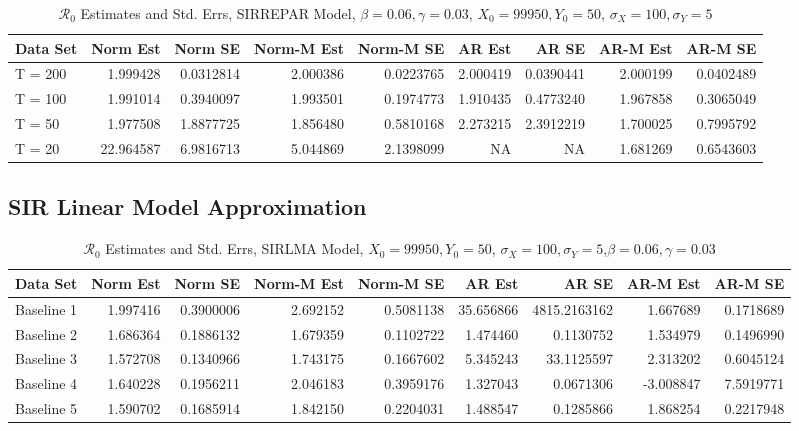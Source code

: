 \documentclass[12pt]{article}
\newcommand{\rr}{\ensuremath{\mathcal{R}_0}}
\begin{document}
\begin{table}[H]
	
	\caption{\label{tab:}$\rr$ Estimates and Std. Errs, SIRREPAR Model,
		$\beta = 0.06, \gamma = 0.03$, $X_0 = 99950, Y_0 = 50$, $\sigma_X = 100, \sigma_Y = 5$}
	\centering
	\begin{tabular}[t]{l|r|r|r|r|r|r|r|r}
		\hline
		Data Set & Norm Est & Norm SE & Norm-M Est & Norm-M SE & AR Est & AR SE & AR-M Est & AR-M SE\\
		\hline
		T = 200 & 1.999428 & 0.0312814 & 2.000386 & 0.0223765 & 2.000419 & 0.0390441 & 2.000199 & 0.0402489\\
		\hline
		T = 100 & 1.991014 & 0.3940097 & 1.993501 & 0.1974773 & 1.910435 & 0.4773240 & 1.967858 & 0.3065049\\
		\hline
		T = 50 & 1.977508 & 1.8877725 & 1.856480 & 0.5810168 & 2.273215 & 2.3912219 & 1.700025 & 0.7995792\\
		\hline
		T = 20 & 22.964587 & 6.9816713 & 5.044869 & 2.1398099 & NA & NA & 1.681269 & 0.6543603\\
		\hline
	\end{tabular}
\end{table}

\subsection{SIR Linear Model Approximation}

\begin{table}[H]
	
	\caption{\label{tab:}$\rr$ Estimates and Std. Errs, SIRLMA Model,
		$X_0 = 99950, Y_0 = 50$, $\sigma_X = 100, \sigma_Y = 5$,$\beta = 0.06, \gamma = 0.03$}
	\centering
	\begin{footnotesize}
		\begin{tabular}[t]{l|r|r|r|r|r|r|r|r}
			\hline
			Data Set & Norm Est & Norm SE & Norm-M Est & Norm-M SE & AR Est & AR SE & AR-M Est & AR-M SE\\
			\hline
			Baseline 1 & 1.997416 & 0.3900006 & 2.692152 & 0.5081138 & 35.656866 & 4815.2163162 & 1.667689 & 0.1718689\\
			\hline
			Baseline 2 & 1.686364 & 0.1886132 & 1.679359 & 0.1102722 & 1.474460 & 0.1130752 & 1.534979 & 0.1496990\\
			\hline
			Baseline 3 & 1.572708 & 0.1340966 & 1.743175 & 0.1667602 & 5.345243 & 33.1125597 & 2.313202 & 0.6045124\\
			\hline
			Baseline 4 & 1.640228 & 0.1956211 & 2.046183 & 0.3959176 & 1.327043 & 0.0671306 & -3.008847 & 7.5919771\\
			\hline
			Baseline 5 & 1.590702 & 0.1685914 & 1.842150 & 0.2204031 & 1.488547 & 0.1285866 & 1.868254 & 0.2217948\\
			\hline
		\end{tabular}
	\end{footnotesize}
\end{table}
\end{document}
